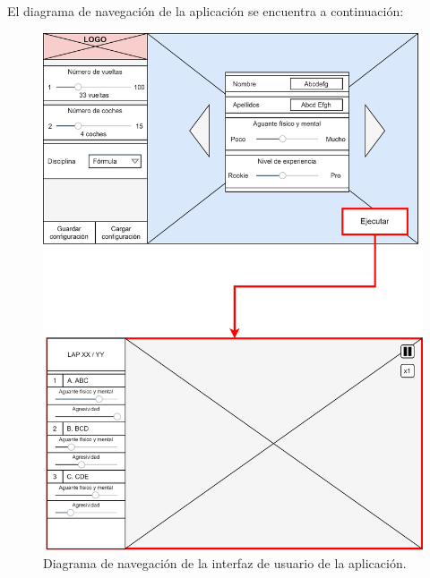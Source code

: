 \bigskip

El diagrama de navegación de la aplicación se encuentra a continuación:

\begin{figure}[H]
    \centering
    \includegraphics[width=\textwidth]{imagenes/nav.png}
    \caption{Diagrama de navegación de la interfaz de usuario de la aplicación.}
 \end{figure}